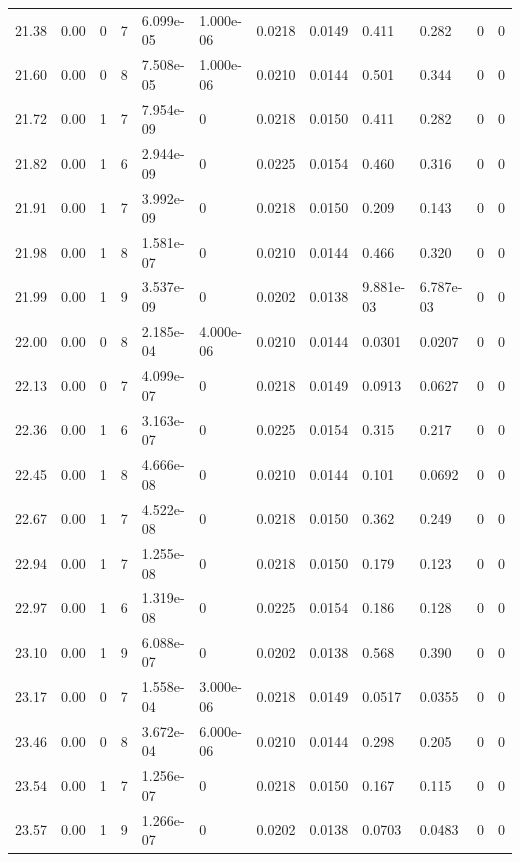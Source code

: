 \documentclass[preview]{standalone}
\begin{document}
{{{{{{\begin{tabular}{L{1.2cm}C{1.2cm} C{0.3cm}C{0.5cm} C{1.4cm}C{1.4cm} C{1.4cm}C{1.4cm} C{1.6cm}C{1.6cm} C{1.6cm}C{1.6cm}}
  21.38  &  0.00  & 0     &  7 &  6.099e-05  & 1.000e-06  &  0.0218&   0.0149& 0.411 & 0.282   &  0 & 0  \\ 
  21.60  &  0.00  & 0     &  8 &  7.508e-05  & 1.000e-06  &  0.0210&   0.0144& 0.501 & 0.344   &  0 & 0  \\ 
  21.72  &  0.00  & 1     &  7 &  7.954e-09  & 0  &  0.0218&   0.0150& 0.411 & 0.282   &  0 & 0  \\ 
  21.82  &  0.00  & 1     &  6 &  2.944e-09  & 0  &  0.0225&   0.0154& 0.460 & 0.316   &  0 & 0  \\ 
  21.91  &  0.00  & 1     &  7 &  3.992e-09  & 0  &  0.0218&   0.0150& 0.209 & 0.143   &  0 & 0  \\ 
  21.98  &  0.00  & 1     &  8 &  1.581e-07  & 0  &  0.0210&   0.0144& 0.466 & 0.320   &  0 & 0  \\ 
  21.99  &  0.00  & 1     &  9 &  3.537e-09  & 0  &  0.0202&   0.0138& 9.881e-03 & 6.787e-03   &  0 & 0  \\ 
  22.00  &  0.00  & 0     &  8 &  2.185e-04  & 4.000e-06  &  0.0210&   0.0144& 0.0301 & 0.0207   &  0 & 0  \\ 
  22.13  &  0.00  & 0     &  7 &  4.099e-07  & 0  &  0.0218&   0.0149& 0.0913 & 0.0627   &  0 & 0  \\ 
  22.36  &  0.00  & 1     &  6 &  3.163e-07  & 0  &  0.0225&   0.0154& 0.315 & 0.217   &  0 & 0  \\ 
  22.45  &  0.00  & 1     &  8 &  4.666e-08  & 0  &  0.0210&   0.0144& 0.101 & 0.0692   &  0 & 0  \\ 
  22.67  &  0.00  & 1     &  7 &  4.522e-08  & 0  &  0.0218&   0.0150& 0.362 & 0.249   &  0 & 0  \\ 
  22.94  &  0.00  & 1     &  7 &  1.255e-08  & 0  &  0.0218&   0.0150& 0.179 & 0.123   &  0 & 0  \\ 
  22.97  &  0.00  & 1     &  6 &  1.319e-08  & 0  &  0.0225&   0.0154& 0.186 & 0.128   &  0 & 0  \\ 
  23.10  &  0.00  & 1     &  9 &  6.088e-07  & 0  &  0.0202&   0.0138& 0.568 & 0.390   &  0 & 0  \\ 
  23.17  &  0.00  & 0     &  7 &  1.558e-04  & 3.000e-06  &  0.0218&   0.0149& 0.0517 & 0.0355   &  0 & 0  \\ 
  23.46  &  0.00  & 0     &  8 &  3.672e-04  & 6.000e-06  &  0.0210&   0.0144& 0.298 & 0.205   &  0 & 0  \\ 
  23.54  &  0.00  & 1     &  7 &  1.256e-07  & 0  &  0.0218&   0.0150& 0.167 & 0.115   &  0 & 0  \\ 
  23.57  &  0.00  & 1     &  9 &  1.266e-07  & 0  &  0.0202&   0.0138& 0.0703 & 0.0483   &  0 & 0  \\ 

\end{tabular}}}}}}}
\end{document}
